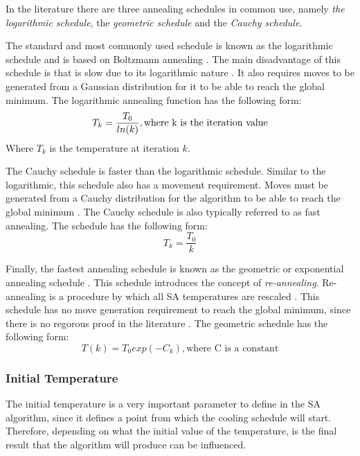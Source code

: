 In the literature there are three annealing schedules in common use, namely \emph{the logarithmic schedule}, the \emph{geometric schedule} and the \emph{Cauchy schedule}\cite{VeryFastSAImageEnchancement,SASingleMultiObj}. 

The standard and most commonly used schedule is known as the logarithmic schedule and is based on Boltzmann annealing \cite{VeryFastSAImageEnchancement}. The main disadvantage of this schedule is that is slow due to its logarithmic nature \cite{VeryFastSAImageEnchancement}. It also requires moves to be generated from a Gaussian distribution for it to be able to reach the global minimum\cite{SASingleMultiObj}. The logarithmic annealing function has the following form:
\begin{equation}
\label{eq:logcooling}
	T_k = \frac{T_0}{ln(k)},\text{where k is the iteration value}\\
\end{equation}
Where $T_k$ is the temperature at iteration $k$.

The Cauchy schedule is faster than the logarithmic schedule. Similar to the logarithmic, this schedule also has a movement requirement. Moves must be generated from a Cauchy distribution for the algorithm to be able to reach the global minimum \cite{SASingleMultiObj,VeryFastSAImageEnchancement}. The Cauchy schedule is also typically referred to as fast annealing\cite{VeryFastSAImageEnchancement}. The schedule has the following form:
\begin{equation}
\label{eq:cauchycooling}
	T_k = \frac{T_0}{k}
\end{equation}

Finally, the fastest annealing schedule is known as the geometric or exponential annealing schedule \cite{SASingleMultiObj}. This schedule introduces the concept of \emph{re-annealing}. Re-annealing is a procedure by which all SA temperatures are rescaled \cite{VeryFastSAImageEnchancement}. This schedule has no move generation requirement to reach the global minimum, since there is no regorous proof in the literature \cite{SASingleMultiObj}. The geometric schedule has the following form:
\begin{equation}
\label{eq:geocooling}
	T(k)=T_0exp(-C_k),\text{where C is a constant}
\end{equation}
\subsubsection{Initial Temperature}
The initial temperature is a very important parameter to define in the SA algorithm, since it defines a point from which the cooling schedule will start. Therefore, depending on what the initial value of the temperature, is the final result that the algorithm will produce can be influenced\cite{SALongestCommon,VariousCoolingSA,AutoConfigSA}.

